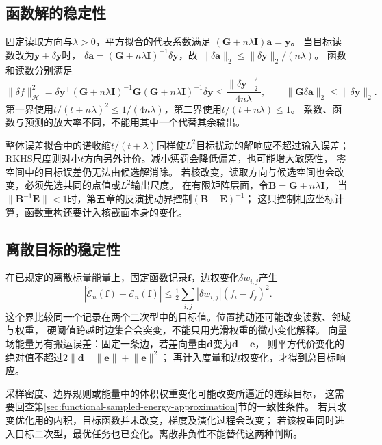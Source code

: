 \subsection{函数解的稳定性}
\label{sec:functional-solution-stability}

固定读取方向与$\lambda>0$，平方拟合的代表系数满足
$(\bm G+n\lambda\bm I)\bm a=\bm y$。
当目标读数改为$\bm y+\delta\bm y$时，
$\delta\bm a=(\bm G+n\lambda\bm I)^{-1}\delta\bm y$，故
$\lVert\delta\bm a\rVert_2\leq\lVert\delta\bm y\rVert_2/(n\lambda)$。
函数和读数分别满足
\[
 \lVert\delta f\rVert_{\mathcal H}^2
 =\delta\bm y^\top(\bm G+n\lambda\bm I)^{-1}
      \bm G(\bm G+n\lambda\bm I)^{-1}\delta\bm y
 \leq\frac{\lVert\delta\bm y\rVert_2^2}{4n\lambda},
 \qquad
 \lVert\bm G\delta\bm a\rVert_2\leq\lVert\delta\bm y\rVert_2.
\]
第一界使用$t/(t+n\lambda)^2\leq1/(4n\lambda)$，第二界使用$t/(t+n\lambda)\leq1$。
系数、函数与预测的放大率不同，不能用其中一个代替其余输出。

整体误差拟合中的谱收缩$t/(t+\lambda)$同样使$L^2$目标扰动的解响应不超过输入误差；
RKHS尺度则对小$t$方向另外计价。减小惩罚会降低偏差，也可能增大敏感性，
零空间中的目标误差仍无法由候选解消除。
若核改变，读取方向与候选空间也会改变，必须先选共同的点值或$L^2$输出尺度。
在有限矩阵层面，令$\bm B=\bm G+n\lambda\bm I$，
当$\lVert\bm B^{-1}\bm E\rVert<1$时，第五章的反演扰动界控制$(\bm B+\bm E)^{-1}$；
这只控制相应坐标计算，函数重构还要计入核截面本身的变化。

\subsection{离散目标的稳定性}
\label{sec:functional-discrete-objective-stability}

在已规定的离散标量能量上，固定函数记录$\bm f$，边权变化$\delta w_{i,j}$产生
\[
 |\widetilde{\mathcal E}_n(\bm f)-\mathcal E_n(\bm f)|
 \leq\tfrac12\sum_{i,j}|\delta w_{i,j}|(f_i-f_j)^2.
\]
这个界比较同一个记录在两个二次型中的目标值。位置扰动还可能改变读数、邻域与权重，
硬阈值跨越时边集合会突变，不能只用光滑权重的微小变化解释。
向量场能量另有搬运误差：固定一条边，若差向量由$\bm d$变为$\bm d+\bm e$，
则平方代价变化的绝对值不超过$2\lVert\bm d\rVert\lVert\bm e\rVert+\lVert\bm e\rVert^2$；
再计入度量和边权变化，才得到总目标响应。

采样密度、边界规则或能量中的体积权重变化可能改变所逼近的连续目标，
这需要回查第\ref{sec:functional-sampled-energy-approximation}节的一致性条件。
若只改变优化用的内积，目标函数并未改变，梯度及演化过程会改变；
若该权重同时进入目标二次型，最优任务也已变化。离散非负性不能替代这两种判断。

